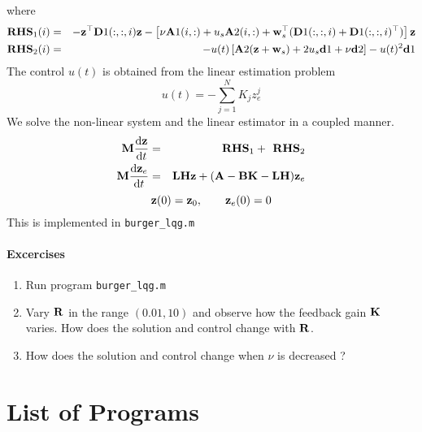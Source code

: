 \documentclass[12pt]{article}
\begin{document}
where 
\begin{eqnarray*}
 \textbf{RHS}_1(i) &=& - {\mathbf z}^\top {\mathbf D}1(:,:,i) {\mathbf z} - \left[ \nu {\mathbf A}1(i,:) + u_s {\mathbf A}2(i,:) + {\mathbf w}_s^\top ({\mathbf D}1(:,:,i) + {\mathbf D}1(:,:,i)^\top) \right] {\mathbf z} \\
 \textbf{RHS}_2(i) &=& - u(t) \left[ {\mathbf A}2 ({\mathbf z} + {\mathbf w}_s) + 2 u_s {\mathbf d}1 +\nu {\mathbf d}2 \right] - u(t)^2 {\mathbf d}1 
\end{eqnarray*}
The control $u(t)$ is obtained from the linear estimation problem
\[
 u(t) = - \sum_{j=1}^N K_j z_e^j
\]
We solve the non-linear system and the linear estimator in a coupled manner.
\begin{eqnarray*}
 {\mathbf M} \frac{\textrm{d} {\mathbf z}}{\textrm{d} t} &=& \textbf{ RHS}_1 + \textbf{ RHS}_2\\
 {\mathbf M} \frac{\textrm{d} {\mathbf z}_e}{\textrm{d} t} &=& {\mathbf L} {\mathbf H} {\mathbf z} + ({\mathbf A} - {\mathbf B} {\mathbf K} - {\mathbf L} {\mathbf H}) {\mathbf z}_e
\end{eqnarray*}
\[
{\mathbf z}(0) = {\mathbf z}_0, \qquad {\mathbf z}_e(0) = 0
\]
This is implemented in {\tt burger\_lqg.m}

\paragraph{Excercises}

\begin{enumerate}

\item Run program {\tt burger\_lqg.m}

\item Vary ${\mathbf R}$ in the range $(0.01,10)$ and observe how the feedback gain ${\mathbf K}$ varies. How does the solution and control change with ${\mathbf R}$.

\item How does the solution and control change when $\nu$ is decreased ?

\end{enumerate}

\section{List of Programs}
\end{document}

